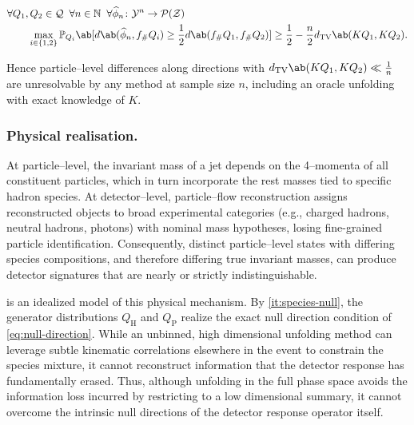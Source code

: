\documentclass[12pt]{article}
\newcommand{\Herwig}{\mathrm{H}}
\newcommand{\Pythia}{\mathrm{P}}
\newcommand{\Prb}{\mathbb{P}}
\newcommand{\TV}{d_{\mathrm{TV}}}
\newcommand{\Meas}{\mathcal{P}}
\newcommand{\1}{\mathbbm{1}}
\newcommand{\pushf}[1]{#1_{\#}}
\renewcommand{\[}{\begin{equation}}
\renewcommand{\]}{\end{equation}}
\begin{document}
\begin{proposition}
    \label{prop:near-null}
        \[
        \label{eq:lecam}
            \begin{split}
                \forall Q_1,&\, Q_2 \in \mathcal Q \;\; \forall n \in \mathbb N \;\; \forall \widehat\phi_n \colon \mathcal{Y}^n \to \Meas(\mathcal{Z}) \\
                &\max_{i \in \{1,2\}} \Prb_{Q_i} \ab[ d \ab( \widehat\phi_n, \pushf fQ_i) \ge \frac12 d \ab( \pushf fQ_1,\pushf fQ_2)] \ge \frac12 - \frac n2 \TV \ab( KQ_1, KQ_2).
            \end{split}
        \]
    \end{proposition}

    Hence particle--level differences along directions with \( \TV \ab(KQ_1, KQ_2) \ll \frac1n \) are unresolvable by any method at sample size \(n\), including an oracle unfolding with exact knowledge of \(K\).

    \subsubsection{Physical realisation.}
    
        At particle--level, the invariant mass of a jet depends on the \num{4}--momenta of all constituent particles, which in turn incorporate the rest masses tied to specific hadron species.
        At detector--level, particle--flow reconstruction assigns reconstructed objects to broad experimental categories (e.g., charged hadrons, neutral hadrons, photons) with nominal mass hypotheses, losing fine-grained particle identification.
        Consequently, distinct particle--level states with differing species compositions, and therefore differing true invariant masses, can produce detector signatures that are nearly or strictly indistinguishable.
        
         is an idealized model of this physical mechanism.
        By \cref{it:species-null}, the generator distributions \(Q_\Herwig\) and \(Q_\Pythia\) realize the exact null direction condition of \cref{eq:null-direction}.
        While an unbinned, high dimensional unfolding method can leverage subtle kinematic correlations elsewhere in the event to constrain the species mixture, it cannot reconstruct information that the detector response has fundamentally erased.
        Thus, although unfolding in the full phase space avoids the information loss incurred by restricting to a low dimensional summary, it cannot overcome the intrinsic null directions of the detector response operator itself.
\end{document}

